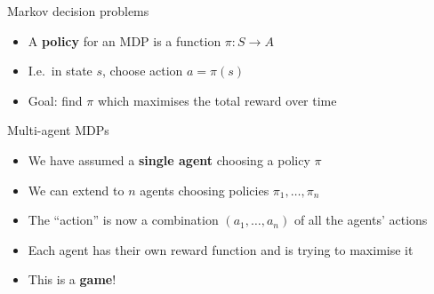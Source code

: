 \begin{frame}{Markov decision problems}
	\begin{itemize}
		\pause\item A \textbf{policy} for an MDP is a function $\pi : S \to A$
		\pause\item I.e.\ in state $s$, choose action $a = \pi(s)$
		\pause\item Goal: find $\pi$ which maximises the total reward over time
	\end{itemize}
\end{frame}

\begin{frame}{Multi-agent MDPs}
	\begin{itemize}
		\pause\item We have assumed a \textbf{single agent} choosing a policy $\pi$
		\pause\item We can extend to $n$ agents choosing policies $\pi_1, \dots, \pi_n$
		\pause\item The ``action'' is now a combination $(a_1, \dots, a_n)$ of all the agents' actions
		\pause\item Each agent has their own reward function and is trying to maximise it
		\pause\item This is a \textbf{game}!
	\end{itemize}
\end{frame}

